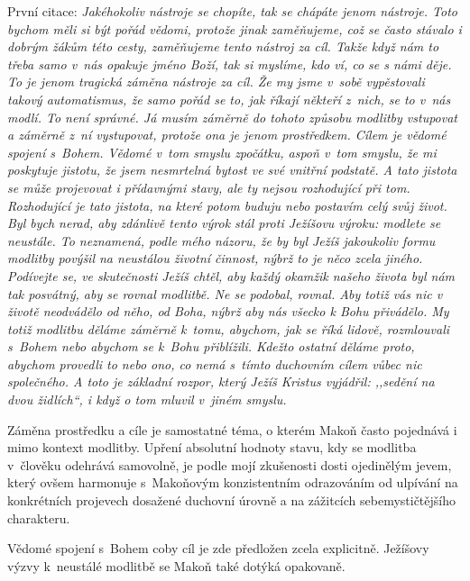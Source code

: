 \begin{enumerate}
{    První citace: \textit{%
      Jakéhokoliv nástroje se chopíte, tak se chápáte jenom nástroje. Toto
      bychom měli si být pořád vědomi, protože jinak zaměňujeme, což se často
      stávalo i dobrým žákům této cesty, zaměňujeme tento nástroj za cíl. Takže
      když nám to třeba samo v~nás opakuje jméno Boží, tak si myslíme, kdo ví,
      co se s námi děje. To je jenom tragická záměna nástroje za cíl. Že my jsme
      v~sobě vypěstovali takový automatismus, že samo pořád se to, jak říkají
      někteří z~nich, se to v~nás modlí. To není správné. Já musím záměrně do
      tohoto způsobu modlitby vstupovat a záměrně z~ní vystupovat, protože ona
      je jenom prostředkem. Cílem je vědomé spojení s~Bohem. Vědomé v~tom smyslu
      zpočátku, aspoň v~tom smyslu, že mi poskytuje jistotu, že jsem nesmrtelná
      bytost ve své vnitřní podstatě. A tato jistota se může projevovat i
      přídavnými stavy, ale ty nejsou rozhodující při tom. Rozhodující je tato
      jistota, na které potom buduju nebo postavím celý svůj život. Byl bych
      nerad, aby zdánlivě tento výrok stál proti Ježíšovu výroku: modlete se
      neustále. To neznamená, podle mého názoru, že by byl Ježíš jakoukoliv
      formu modlitby povýšil na neustálou životní činnost, nýbrž to je něco
      zcela jiného. Podívejte se, ve skutečnosti Ježíš chtěl, aby každý okamžik
      našeho života byl nám tak posvátný, aby se rovnal modlitbě. Ne se podobal,
      rovnal. Aby totiž vás nic v životě neodvádělo od něho, od Boha, nýbrž aby
      nás všecko k Bohu přivádělo. My totiž modlitbu děláme záměrně k~tomu,
      abychom, jak se říká lidově, rozmlouvali s~Bohem nebo abychom se k~Bohu
      přiblížili. Kdežto ostatní děláme proto, abychom provedli to nebo ono, co
      nemá s~tímto duchovním cílem vůbec nic společného. A toto je základní
      rozpor, který Ježíš Kristus vyjádřil: ,,sedění na dvou židlích``, i když o
      tom mluvil v~jiném smyslu.
    }

    Záměna prostředku a cíle je samostatné téma, o kterém Makoň často pojednává
    i mimo kontext modlitby. Upření absolutní hodnoty stavu, kdy se modlitba
    v~člověku odehrává samovolně, je podle mojí zkušenosti dosti ojedinělým
    jevem, který ovšem harmonuje s~Makoňovým konzistentním odrazováním od
    ulpívání na konkrétních projevech dosažené duchovní úrovně a na zážitcích
    sebemystičtějšího charakteru.

    Vědomé spojení s~Bohem coby cíl je zde předložen zcela explicitně.
    Ježíšovy výzvy k~neustálé modlitbě se Makoň také dotýká opakovaně.

}
\end{enumerate}

